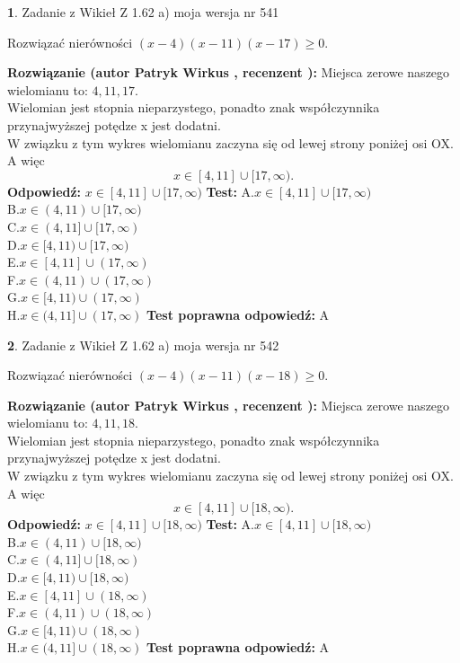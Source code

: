\documentclass[12pt, a4paper]{article}
\theoremstyle{definition} %
\newtheorem{zad}{}
\newcommand{\zadStart}[1]{\begin{zad}#1\newline}
\newcommand{\zadStop}{\end{zad}}
\newcommand{\rozwStart}[2]{\noindent \textbf{Rozwiązanie (autor #1 , recenzent #2): }\newline}
\newcommand{\rozwStop}{\newline}
\newcommand{\odpStart}{\noindent \textbf{Odpowiedź:}\newline}
\newcommand{\odpStop}{\newline}
\newcommand{\testStart}{\noindent \textbf{Test:}\newline}
\newcommand{\testStop}{\newline}
\newcommand{\kluczStart}{\noindent \textbf{Test poprawna odpowiedź:}\newline}
\newcommand{\kluczStop}{\newline}
\begin{document}
\zadStart{Zadanie z Wikieł Z 1.62 a) moja wersja nr 541}

Rozwiązać nierówności $(x-4)(x-11)(x-17)\ge0$.
\zadStop
\rozwStart{Patryk Wirkus}{}
Miejsca zerowe naszego wielomianu to: $4, 11, 17$.\\
Wielomian jest stopnia nieparzystego, ponadto znak współczynnika przy\linebreak najwyższej potędze x jest dodatni.\\ W związku z tym wykres wielomianu zaczyna się od lewej strony poniżej osi OX. A więc $$x \in [4,11] \cup [17,\infty).$$
\rozwStop
\odpStart
$x \in [4,11] \cup [17,\infty)$
\odpStop
\testStart
A.$x \in [4,11] \cup [17,\infty)$\\
B.$x \in (4,11) \cup [17,\infty)$\\
C.$x \in (4,11] \cup [17,\infty)$\\
D.$x \in [4,11) \cup [17,\infty)$\\
E.$x \in [4,11] \cup (17,\infty)$\\
F.$x \in (4,11) \cup (17,\infty)$\\
G.$x \in [4,11) \cup (17,\infty)$\\
H.$x \in (4,11] \cup (17,\infty)$
\testStop
\kluczStart
A
\kluczStop



\zadStart{Zadanie z Wikieł Z 1.62 a) moja wersja nr 542}

Rozwiązać nierówności $(x-4)(x-11)(x-18)\ge0$.
\zadStop
\rozwStart{Patryk Wirkus}{}
Miejsca zerowe naszego wielomianu to: $4, 11, 18$.\\
Wielomian jest stopnia nieparzystego, ponadto znak współczynnika przy\linebreak najwyższej potędze x jest dodatni.\\ W związku z tym wykres wielomianu zaczyna się od lewej strony poniżej osi OX. A więc $$x \in [4,11] \cup [18,\infty).$$
\rozwStop
\odpStart
$x \in [4,11] \cup [18,\infty)$
\odpStop
\testStart
A.$x \in [4,11] \cup [18,\infty)$\\
B.$x \in (4,11) \cup [18,\infty)$\\
C.$x \in (4,11] \cup [18,\infty)$\\
D.$x \in [4,11) \cup [18,\infty)$\\
E.$x \in [4,11] \cup (18,\infty)$\\
F.$x \in (4,11) \cup (18,\infty)$\\
G.$x \in [4,11) \cup (18,\infty)$\\
H.$x \in (4,11] \cup (18,\infty)$
\testStop
\kluczStart
A
\kluczStop
\end{document}
